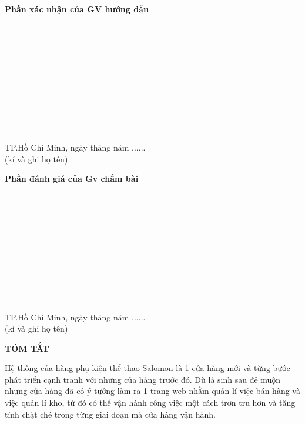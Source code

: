 \documentclass{article}
\begin{document}
\textbf{Phần xác nhận của GV hướng dẫn}
\begin{flushright}

\ \xfill{1pt} \ 

\ \xfill{1pt} \ 

\ \xfill{1pt} \ 

\ \xfill{1pt} \ 

\ \xfill{1pt} \ 

\ \xfill{1pt} \ 

TP.Hồ Chí Minh, ngày  tháng  năm ......\\

(kí và ghi họ tên) \\[2.5cm]       
\end{flushright}


\textbf{Phần đánh giá của Gv chấm bài}
\begin{flushright}

\ \xfill{1pt} \ 

\ \xfill{1pt} \ 

\ \xfill{1pt} \ 

\ \xfill{1pt} \ 

\ \xfill{1pt} \ 

\ \xfill{1pt} \ 

TP.Hồ Chí Minh, ngày  tháng  năm ......\\

        (kí và ghi họ tên)
\end{flushright}
\pagebreak

\begin{center}
    \fontsize{16}{20}\selectfont
    \textbf{TÓM TẮT}
\end{center}
\fontsize{13}{20}\selectfont

Hệ thống của hàng phụ kiện thể thao Salomon là 1 cửa hàng mới và từng bước phát triển cạnh tranh với những của hàng trước đó. Dù là sinh sau đẻ muộn nhưng cửa hàng đã có ý tưởng làm ra 1 trang web nhằm quản lí việc bán hàng và việc quản lí kho, từ đó có thể vận hành công việc một cách trơn tru hơn và tăng tính chặt ché trong từng giai đoạn mà cửa hàng vận hành.
\end{document}
